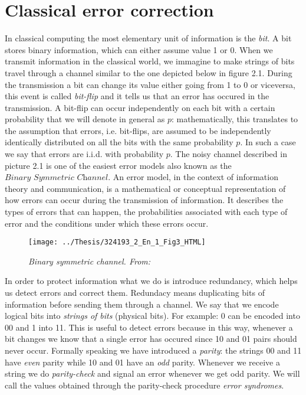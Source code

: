 \documentclass{Configuration_Files/PoliMi3i_thesis}
\begin{document}
\section{Classical error correction}
\label{sec:CER}

In classical computing the most elementary unit of information is the {\it bit}. A bit stores binary information, which can either assume value 1 or 0. When we transmit information in the classical world, we immagine to make strings of bits travel through a channel similar to the one depicted below in figure 2.1. During the transmission a bit can change its value either going from 1 to 0 or viceversa, this event is called {\it bit-flip} and it tells us that an error has occured in the transmission. A bit-flip can occur independently on each bit with a certain probability that we will denote in general as $p$: mathematically, this translates to the assumption that errors, i.e. bit-flips,  are assumed to be independently identically distributed on all the bits with the same probability $p$. In such a case we say that errors are i.i.d. with probability $p$.\newline
The noisy channel described in picture 2.1 is one of the easiest error models also known as the $\textit{Binary Symmetric Channel}$. An error model, in the context of information theory and communication, is a mathematical or conceptual representation of how errors can occur during the transmission of information. It describes the types of errors that can happen, the probabilities associated with each type of error and the conditions under which these errors occur. \newline

\begin{figure}
	\centering
	\texttt{[image: ../Thesis/324193\_2\_En\_1\_Fig3\_HTML]}
	\caption{{\it Binary symmetric channel. From: \cite{Cha06}}}
	\label{fig:3241932en1fig3html}
\end{figure}


\newpage
In order to protect information what we do is introduce redundancy, which helps us detect errors and correct them. Redundacy means duplicating bits of information before sending them through a channel. We say that we encode logical bits into {\it strings of bits} (physical bits). For example: 0 can be encoded into 00 and 1 into 11. This is useful to detect errors because in this way, whenever a bit changes we know that a single error has occured since 10 and 01 pairs should never occur. Formally speaking we have introduced a {\it parity}: the strings 00 and 11 have {\it even} parity while 10 and 01 have an {\it odd} parity. Whenever we receive a string we do {\it parity-check} and signal an error whenever we get odd parity. We will call the values obtained through the parity-check procedure {\it error syndromes}.\newline
\end{document}
